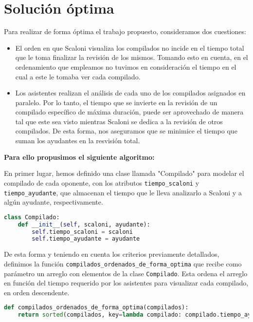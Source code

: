 
\section{Solución óptima}

Para realizar de forma óptima el trabajo propuesto, consideramos dos cuestiones:

\begin{itemize}

    \item El orden en que Scaloni visualiza los compilados no incide en el tiempo total que le toma 
finalizar la revisión de los mismos. Tomando esto en cuenta, en el ordenamiento que empleamos no 
tuvimos en consideración el tiempo en el cual a este le tomaba ver cada compilado. 

    \item Los asistentes realizan el análisis de cada uno de los compilados asignados en paralelo. Por lo 
tanto, el tiempo que se invierte en la revisión de un compilado específico de máxima duración, 
puede ser aprovechado de manera tal que este sea visto mientras Scaloni se dedica a la revisión
de otros compilados. De esta forma, nos aseguramos que se minimice el tiempo que suman los ayudantes 
en la resvisión total. 


\end{itemize}

\textbf{Para ello propusimos el siguiente algoritmo:}

En primer lugar, hemos definido una clase llamada "Compilado" para modelar el compilado de cada 
oponente, con los atributos \texttt{tiempo\_scaloni} y \texttt{tiempo\_ayudante}, que almacenan 
el tiempo que le lleva analizarlo a Scaloni y a algún ayudante, respectivamente.

\begin{lstlisting}[language=Python]
class Compilado:
    def __init__(self, scaloni, ayudante):
        self.tiempo_scaloni = scaloni
        self.tiempo_ayudante = ayudante
\end{lstlisting}

De esta forma y teniendo en cuenta los criterios previamente detallados, definimos la función
\texttt{compilados\_ordenados\_de\_forma\_optima} que recibe como parámetro un arreglo con
elementos de la clase \texttt{Compilado}. Esta ordena el arreglo en función del tiempo requerido
por los asistentes para visualizar cada compilado, en orden descendente. 

\begin{lstlisting}[language=Python]
def compilados_ordenados_de_forma_optima(compilados):
    return sorted(compilados, key=lambda compilado: compilado.tiempo_ayudante, reverse=True)
\end{lstlisting}
